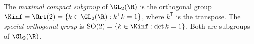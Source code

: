 The \emph{maximal compact subgroup} of $\GL_2(\R)$ is the orthogonal group
$\Kinf=\Ort(2)=\{k\in\GL_2(\R):k^{\mathsf T}k=1\}$, where $k^{\mathsf T}$ is the transpose. The
\emph{special orthogonal group} is $\mathrm{SO}(2)=\{k\in\Kinf:\det k=1\}$. Both are subgroups of $\GL_2(\R)$.
